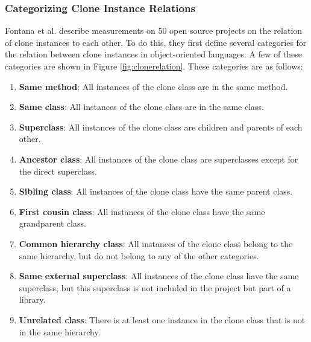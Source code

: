 \subsubsection{Categorizing Clone Instance Relations}\label{chap:catcloneinstancerelations}
Fontana et al. \cite{fontana2015duplicated} describe measurements on 50 open source projects on the relation of clone instances to each other. To do this, they first define several categories for the relation between clone instances in object-oriented languages. A few of these categories are shown in Figure \ref{fig:clonerelation}. These categories are as follows:
\begin{enumerate}
  \item \textbf{Same method}: All instances of the clone class are in the same method.
  \item \textbf{Same class}: All instances of the clone class are in the same class.
  \item \textbf{Superclass}: All instances of the clone class are children and parents of each other.
  \item \textbf{Ancestor class}: All instances of the clone class are superclasses except for the direct superclass.
  \item \textbf{Sibling class}: All instances of the clone class have the same parent class.
  \item \textbf{First cousin class}: All instances of the clone class have the same grandparent class.
\item \textbf{Common hierarchy class}: All instances of the clone class belong to the same hierarchy, but do not belong to any of the other categories.
\item \textbf{Same external superclass}: All instances of the clone class have the same superclass, but this superclass is not included in the project but part of a library.
\item \textbf{Unrelated class}: There is at least one instance in the clone class that is not in the same hierarchy.
\end{enumerate}

